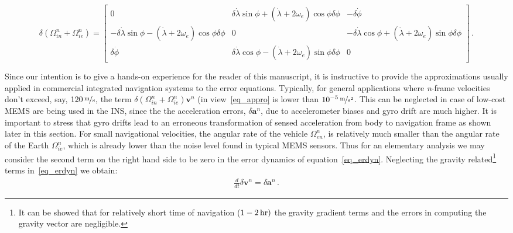 \documentclass[journal]{IEEEtran}
\begin{document}
\begin{strip}
\begin{equation}\label{eq_appro}
   \delta({{\Omega}}_{in}^{n}+{{\Omega}}_{ie}^{n}) =
\begin{bmatrix} 
0             &\delta\dot\lambda\sin\phi+(\dot\lambda+2\omega_e)\cos\phi\delta\phi& -\delta\dot\phi \\ 
-\delta\dot\lambda\sin\phi-(\dot\lambda+2\omega_e)\cos\phi\delta\phi & 0        &-\delta\dot\lambda\cos\phi+(\dot\lambda+2\omega_e)\sin\phi\delta\phi\\
\delta\dot\phi&\delta\dot\lambda\cos\phi-(\dot\lambda+2\omega_e)\sin\phi\delta\phi&0
\end{bmatrix}\,.
\end{equation}
\end{strip}
Since our intention is to give a hands-on experience for the reader of this manuscript, it is instructive to provide the  approximations usually applied in commercial integrated navigation systems to the error equations. Typically, for general applications where \textit{n}-frame velocities don't exceed, say, $\unitfrac[120]{m}{s}$, the term $\delta({{\Omega}}_{in}^{n}+{{\Omega}}_{ie}^{n}){\boldsymbol{v}}^{n}$ (in view~\eqref{eq_appro} is lower than $\unitfrac[10^{-5}]{m}{s^2}$. This can be neglected in case of low-cost MEMS are being used in the INS, since the the  acceleration errors, $\delta\boldsymbol{a}^n$, due to accelerometer biases and gyro drift are much higher. It is important to stress that gyro drifts lead to an erroneous transformation of sensed acceleration from body to navigation frame as shown later in this section. For small navigational velocities, the angular rate of the vehicle $\Omega_{en}^n$, is relatively much smaller  than the angular rate of the Earth $\Omega_{ie}^n$, which is already lower than the noise level found in typical MEMS sensors. Thus for an elementary analysis we may consider the second term on the right hand side  to be zero in the error dynamics of equation~\eqref{eq_erdyn}. Neglecting the gravity related\footnote{It can be showed that for relatively short time of navigation ($ \unit[1-2]{hr})$ the gravity gradient terms and the errors in computing the gravity vector are negligible.} terms in~\eqref{eq_erdyn} we obtain:
\begin{equation}\label{eq_erdynapp}
\begin{aligned}
    \frac{d}{dt}\delta \boldsymbol{v}^n=
     \delta \boldsymbol{a}^n \,.
    \end{aligned}
\end{equation}
\end{document}
